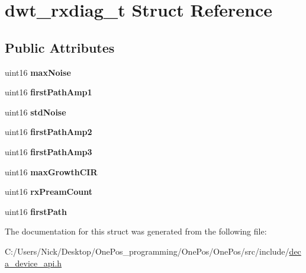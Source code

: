 \hypertarget{structdwt__rxdiag__t}{\section{dwt\-\_\-rxdiag\-\_\-t Struct Reference}
\label{structdwt__rxdiag__t}
}
\subsection*{Public Attributes}
\begin{DoxyCompactItemize}
\item 
\hypertarget{structdwt__rxdiag__t_a32a5fc72dfe82b86973ae87178a67f6a}{uint16 {\bfseries max\-Noise}}\label{structdwt__rxdiag__t_a32a5fc72dfe82b86973ae87178a67f6a}

\item 
\hypertarget{structdwt__rxdiag__t_afdb8dd31f35a945e5033ab6c8d0ff16f}{uint16 {\bfseries first\-Path\-Amp1}}\label{structdwt__rxdiag__t_afdb8dd31f35a945e5033ab6c8d0ff16f}

\item 
\hypertarget{structdwt__rxdiag__t_aaa648780865ce897405deb3d859e7404}{uint16 {\bfseries std\-Noise}}\label{structdwt__rxdiag__t_aaa648780865ce897405deb3d859e7404}

\item 
\hypertarget{structdwt__rxdiag__t_a3cf15d00a34f03f810617dd252b26c3b}{uint16 {\bfseries first\-Path\-Amp2}}\label{structdwt__rxdiag__t_a3cf15d00a34f03f810617dd252b26c3b}

\item 
\hypertarget{structdwt__rxdiag__t_a5a2cfa5b6bcd6dfdde9ccbb39d10ab3b}{uint16 {\bfseries first\-Path\-Amp3}}\label{structdwt__rxdiag__t_a5a2cfa5b6bcd6dfdde9ccbb39d10ab3b}

\item 
\hypertarget{structdwt__rxdiag__t_abb20de7dba5c3f5bc8990d6bf8cdac3c}{uint16 {\bfseries max\-Growth\-C\-I\-R}}\label{structdwt__rxdiag__t_abb20de7dba5c3f5bc8990d6bf8cdac3c}

\item 
\hypertarget{structdwt__rxdiag__t_a9dc2f8f55941b96149682504ed3e0f34}{uint16 {\bfseries rx\-Pream\-Count}}\label{structdwt__rxdiag__t_a9dc2f8f55941b96149682504ed3e0f34}

\item 
\hypertarget{structdwt__rxdiag__t_a7c231614e36c3584bea5c9010df14557}{uint16 {\bfseries first\-Path}}\label{structdwt__rxdiag__t_a7c231614e36c3584bea5c9010df14557}

\end{DoxyCompactItemize}


The documentation for this struct was generated from the following file\-:\begin{DoxyCompactItemize}
\item 
C\-:/\-Users/\-Nick/\-Desktop/\-One\-Pos\-\_\-programming/\-One\-Pos/\-One\-Pos/src/include/\hyperlink{deca__device__api_8h}{deca\-\_\-device\-\_\-api.\-h}\end{DoxyCompactItemize}
